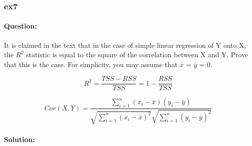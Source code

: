 \documentclass[a4paper,12pt,titlepage]{article} %
\begin{document}
\subsubsection{ex7}
\paragraph{Question:} It is claimed in the text that in the case of simple linear regression of Y onto X, the $R^{2}$ statistic is equal to the square of the correlation between X and Y. Prove that this is the case. For simplicity, you may assume that $\bar{x}$ = $\bar{y}$ = 0.

$$ R^{2} = \frac{TSS - RSS}{TSS} = 1 - \frac{RSS}{TSS} $$

$$ Cor(X,Y) = \frac{\sum_{i=1}^{n} (x_{i}-\bar{x}) (y_{i}-\bar{y})} {\sqrt{\sum_{i=1}^{n} (x_{i}-\bar{x})^{2}} \sqrt{\sum_{i=1}^{n} (y_{i}-\bar{y})^{2}}}$$

\paragraph{Solution:}




\end{document}
